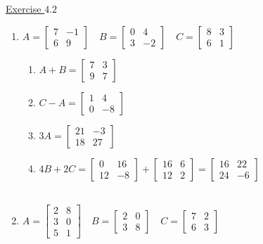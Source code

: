 \underline{Exercise $4.2$}

\begin{enumerate}	
  \item $A=\left[\begin{array}{cc}7 & -1 \\ 6 & 9\end{array}\right] \quad B=\left[\begin{array}{cc}0 & 4 \\ 3 & -2\end{array}\right] \quad C=\left[\begin{array}{ll}8 & 3 \\ 6 & 1\end{array}\right]$
\begin{enumerate}
\item  $A+B=\left[\begin{array}{ll}7 & 3 \\ 9 & 7\end{array}\right]$
\item  $C-A=\left[\begin{array}{cc}1 & 4 \\ 0 & -8\end{array}\right]$
\item  $3 A=\left[\begin{array}{cc}21 & -3 \\ 18 & 27\end{array}\right]$
\item  $4 B+2 C=\left[\begin{array}{cc}0 & 16 \\ 12 & -8\end{array}\right]+\left[\begin{array}{cc}16 & 6 \\ 12 & 2\end{array}\right]=\left[\begin{array}{cc}16 & 22 \\ 24 & -6\end{array}\right]$ \\~\\
\end{enumerate} 

\item $A = \left[\begin{array}{cc}
2 & 8 \\
3 & 0 \\
5 & 1
\end{array}\right] \quad B=\left[\begin{array}{cc} 2 & 0 \\ 3 & 8\end{array}\right] \quad
C=\left[\begin{array}{cc} 7 & 2 \\ 6 & 3\end{array}\right]$


\end{enumerate}
